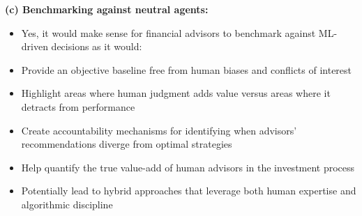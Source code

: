 \documentclass{article}
\begin{document}
\begin{sloppypar}
\textbf{(c) Benchmarking against neutral agents:}
\begin{itemize}
    \item Yes, it would make sense for financial advisors to benchmark against ML-driven decisions as it would:
    \item Provide an objective baseline free from human biases and conflicts of interest
    \item Highlight areas where human judgment adds value versus areas where it detracts from performance
    \item Create accountability mechanisms for identifying when advisors' recommendations diverge from optimal strategies
    \item Help quantify the true value-add of human advisors in the investment process
    \item Potentially lead to hybrid approaches that leverage both human expertise and algorithmic discipline
\end{itemize}

\end{sloppypar}
\end{document}
